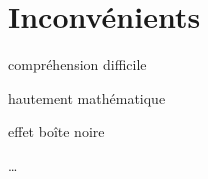 \section{Inconvénients}

\begin{itmz}
\item{compréhension difficile}
\item{hautement mathématique}
\item{effet boîte noire}
\end{itmz}

…

\pagebreak
